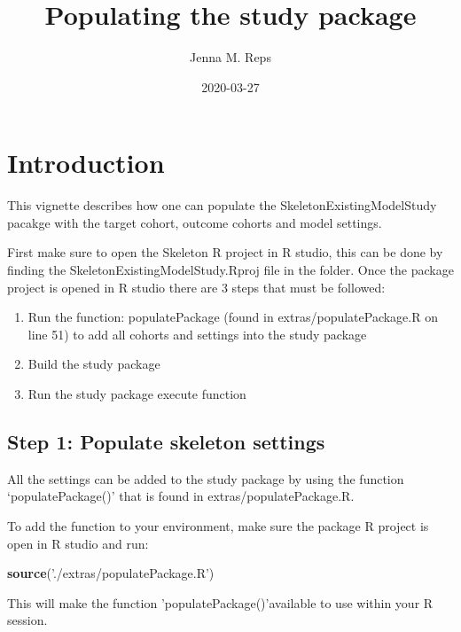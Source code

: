 \documentclass[
]{article}
\title{Populating the study package}
\author{Jenna M. Reps}
\date{2020-03-27}
\newenvironment{Shaded}{\begin{snugshade}}{\end{snugshade}}
\newcommand{\KeywordTok}[1]{\textcolor[rgb]{0.13,0.29,0.53}{\textbf{#1}}}
\newcommand{\NormalTok}[1]{#1}
\newcommand{\StringTok}[1]{\textcolor[rgb]{0.31,0.60,0.02}{#1}}
\providecommand{\tightlist}{%
  \setlength{\itemsep}{0pt}\setlength{\parskip}{0pt}}
\begin{document}
\maketitle

{
\setcounter{tocdepth}{2}
\tableofcontents
}
\hypertarget{introduction}{%
\section{Introduction}\label{introduction}}

This vignette describes how one can populate the
SkeletonExistingModelStudy pacakge with the target cohort, outcome
cohorts and model settings.

First make sure to open the Skeleton R project in R studio, this can be
done by finding the SkeletonExistingModelStudy.Rproj file in the folder.
Once the package project is opened in R studio there are 3 steps that
must be followed:

\begin{enumerate}
\def\labelenumi{\arabic{enumi}.}
\tightlist
\item
  Run the function: populatePackage (found in extras/populatePackage.R
  on line 51) to add all cohorts and settings into the study package
\item
  Build the study package
\item
  Run the study package execute function
\end{enumerate}

\hypertarget{step-1-populate-skeleton-settings}{%
\subsection{Step 1: Populate skeleton
settings}\label{step-1-populate-skeleton-settings}}

All the settings can be added to the study package by using the function
`populatePackage()' that is found in extras/populatePackage.R.

To add the function to your environment, make sure the package R project
is open in R studio and run:

\begin{Shaded}
\begin{Highlighting}[]
\KeywordTok{source}\NormalTok{(}\StringTok{'./extras/populatePackage.R'}\NormalTok{)}
\end{Highlighting}
\end{Shaded}

This will make the function 'populatePackage()'available to use within
your R session.
\end{document}
